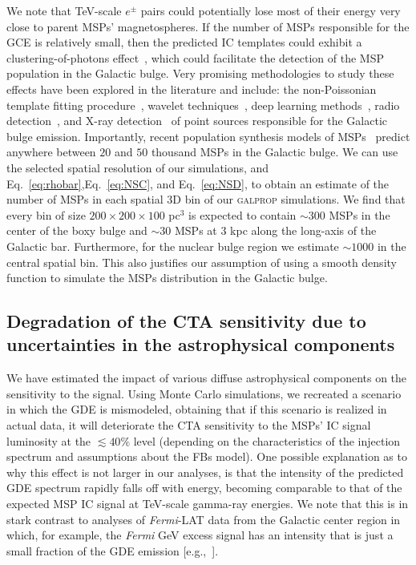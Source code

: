 \documentclass[doublespace,nopageskip]{VTthesis}
\begin{document}
We note that TeV-scale $e^{\pm}$ pairs could potentially lose most of their energy very close to parent MSPs' magnetospheres. If the number of MSPs responsible for the GCE is relatively small, then the predicted IC templates could exhibit a clustering-of-photons effect~\citep{2021JCAP...01..057A}, which could facilitate the detection of the MSP population in the Galactic bulge.  Very promising methodologies to study these effects have been explored in the literature and include: the non-Poissonian template fitting procedure~\cite{2016PhRvL.116e1103L,2019PhRvL.123x1101L,2020PhRvD.101b3014C,2020PhRvD.102f3019L,2020PhRvL.125l1105L,2020PhRvD.102b3023B}, wavelet techniques~\cite{2016PhRvL.116e1102B,2018PhRvD..98d3009B,2020PhRvL.124w1103Z}, deep learning methods~\citep{2018JCAP...05..058C,2020PhRvL.125x1102L}, radio detection~\citep{2016ApJ...827..143C,2015ApJ...805..172M,2017MNRAS.471..730R,2019ApJ...876...20H}, and X-ray detection~\citep{2021PhRvD.104d3007B} of point sources responsible for the Galactic bulge emission.
%
Importantly, recent population synthesis models of MSPs~\citep{2020JCAP...12..035P} predict anywhere between $20$ and $50$ thousand MSPs in the Galactic bulge. We can use the selected spatial resolution of our simulations, and Eq.~\ref{eq:rhobar},Eq.~\ref{eq:NSC}, and Eq.~\ref{eq:NSD}, to obtain an estimate of the number of MSPs in each spatial 3D bin of our \textsc{galprop} simulations. We find that every bin of size $200\times200\times100$ pc$^3$ is expected to contain $\sim 300$ MSPs in the center of the boxy bulge and $\sim 30$ MSPs at 3 kpc along the long-axis of the Galactic bar. Furthermore, for the nuclear bulge region we estimate $\sim 1000$ in the central spatial bin.  This also justifies our assumption of using a smooth density function to simulate the MSPs distribution in the Galactic bulge. 



\subsection{Degradation of the CTA sensitivity due to uncertainties in the astrophysical components}

 We have estimated the impact of various diffuse astrophysical components on the sensitivity to the signal. Using Monte Carlo simulations, we recreated a scenario in which the GDE is mismodeled, obtaining that if this scenario is realized in actual data, it will deteriorate the CTA sensitivity to the MSPs' IC signal luminosity at the $\lesssim 40\%$ level (depending on the characteristics of the injection spectrum and assumptions about the FBs model). 
 One possible explanation as to why this effect is not larger in our analyses, is that the intensity of the predicted GDE spectrum rapidly falls off with energy, becoming comparable to that of the expected MSP IC signal at TeV-scale gamma-ray energies. We note that this is in stark contrast to analyses of \textit{Fermi}-LAT data from the Galactic center region in which, for example, the \textit{Fermi} GeV excess signal has an intensity that is just a small fraction of the GDE emission [e.g.,~\citet{2020PhRvD.102d3012A}].
\end{document}
